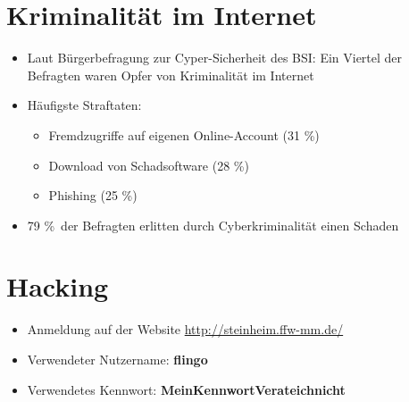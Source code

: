 
\section{Kriminalität im Internet}

\begin{frame}
\begin{itemize}
  \item Laut Bürgerbefragung zur Cyper-Sicherheit des BSI: Ein Viertel der Befragten waren Opfer von Kriminalität im Internet
  \item Häufigste Straftaten:
  \begin{itemize}
    \item Fremdzugriffe auf eigenen Online-Account (31 \%)
    \item Download von Schadsoftware (28 \%)
    \item Phishing (25 \%)
  \end{itemize}
  \item 79 \%\ der Befragten erlitten durch Cyberkriminalität einen Schaden
\end{itemize}
\end{frame}

\section{Hacking}

\begin{frame}
\begin{itemize}
	\item Anmeldung auf der Website \href{http://steinheim.ffw-mm.de/}{http://steinheim.ffw-mm.de/}
	\item Verwendeter Nutzername: \textbf{flingo}
	\item Verwendetes Kennwort: \textbf{MeinKennwortVerateichnicht}
\end{itemize}
\end{frame}

